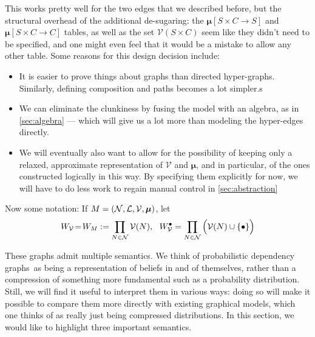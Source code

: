 \documentclass{article}
\newcommand\changed[1]{{\color{note-fg} #1}}
\newcommand\bmu{\boldsymbol{\mu}}
\newcommand{\modelname}{probabilistic dependency graph}
\newcommand{\modelnames}{\modelname s}
\def\seq{\!=\!}
\begin{document}

	

	\begin{vfull}
		This works pretty well for the two edges that we described before, but the structural overhead of the additional de-sugaring: the $\boldsymbol\mu[S\times C\to S]$ and $\boldsymbol\mu[S\times C\to C]$ tables, as well as the set $\mathcal V(S \times C)$ seem like they didn't need to be specified, and one might even feel that it would be a mistake to allow any other table. Some reasons for this design decision include:
		\begin{itemize}[nosep]
			\item It is easier to prove things about graphs than directed hyper-graphs. Similarly, defining composition and paths becomes a lot simpler.s
			\item We can eliminate the clunkiness by fusing the model with an algebra, as in \cref{sec:algebra} --- which will give us a lot more than modeling the hyper-edges directly.
			\item We will eventually also want to allow for the possibility of keeping only a relaxed, approximate representation of $\mathcal V$ and $\bmu$, and in particular, of the ones constructed logically in this way. By specifying them explicitly for now, we will have to do less work to regain manual control in \cref{sec:abstraction}
		\end{itemize}
	\end{vfull}


	Now some notation: If $M = \mnvars[]$, let 
	$$W_{\cal V} \seq W_M :=  \prod_{N \in \mathcal N}\mathcal V(N),~~ W_{\cal V}^\bullet = \prod_{N \in \mathcal N}\Big(\mathcal V(N) \cup \{\bullet\} \Big)$$
			
	These graphs admit multiple semantics. We think of \modelnames\ as being a representation of beliefs in and of themselves, rather than a compression of something more fundamental such as a probability distribution. Still, we will find it useful to interpret them in various ways: doing so will make it possible to compare them more directly with existing graphical models, which one thinks of as really just being compressed distributions. In this section, we would like to highlight three important semantics.
	
\end{document}

